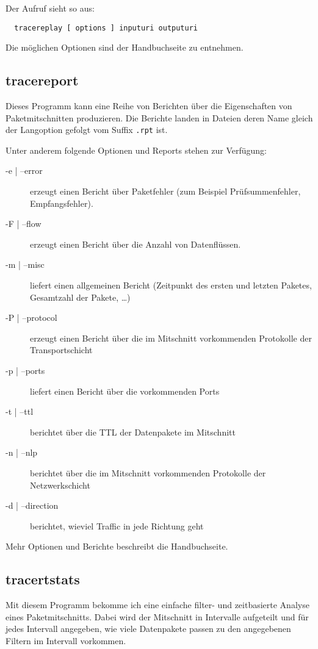 \begin{normaltext}
  Der Aufruf sieht so aus:
  \begin{verbatim}
  tracereplay [ options ] inputuri outputuri
  \end{verbatim}
  Die möglichen Optionen sind der Handbuchseite zu entnehmen.

  \subsection*{tracereport}
  Dieses Programm kann eine Reihe von Berichten über die Eigenschaften von
  Paketmitschnitten produzieren. Die Berichte landen in Dateien deren Name
  gleich der Langoption gefolgt vom Suffix \verb?.rpt? ist.

  Unter anderem folgende Optionen und Reports stehen zur Verfügung:
  \begin{description}
    \item[-e | --error] erzeugt einen Bericht über Paketfehler (zum Beispiel
      Prüfsummenfehler, Empfangsfehler).
    \item[-F | --flow] erzeugt einen Bericht über die Anzahl von Datenflüssen.
    \item[-m | --misc] liefert einen allgemeinen Bericht (Zeitpunkt des ersten
      und letzten Paketes, Gesamtzahl der Pakete, \ldots)
    \item[-P | --protocol] erzeugt einen Bericht über die im Mitschnitt
      vorkommenden Protokolle der Transportschicht
    \item[-p | --ports] liefert einen Bericht über die vorkommenden Ports
    \item[-t | --ttl] berichtet über die TTL der Datenpakete im Mitschnitt
    \item[-n | --nlp] berichtet über die im Mitschnitt vorkommenden Protokolle
      der Netzwerkschicht
    \item[-d | --direction] berichtet, wieviel Traffic in jede Richtung geht
  \end{description}
  Mehr Optionen und Berichte beschreibt die Handbuchseite.

  \subsection*{tracertstats}
  Mit diesem Programm bekomme ich eine einfache filter- und zeitbasierte
  Analyse eines Paketmitschnitts.
  Dabei wird der Mitschnitt in Intervalle aufgeteilt und für jedes Intervall
  angegeben, wie viele Datenpakete passen zu den angegebenen Filtern im
  Intervall vorkommen.


\end{normaltext}
